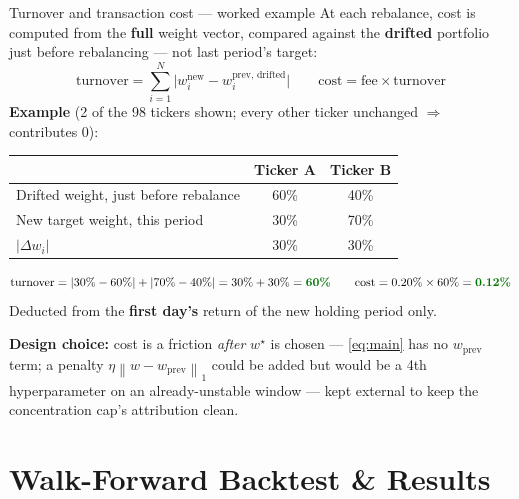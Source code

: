 \documentclass[aspectratio=169]{beamer}
\newcommand{\norm}[1]{\left\lVert #1 \right\rVert}
\newcommand{\good}[1]{\textcolor{green!45!black}{\textbf{#1}}}
\begin{document}
\begin{frame}{Turnover and transaction cost --- worked example}
  \small
  At each rebalance, cost is computed from the \textbf{full} weight vector, compared against
  the \textbf{drifted} portfolio just before rebalancing --- not last period's target:
  \[
    \text{turnover} = \sum_{i=1}^{N} \bigl|w^{\text{new}}_i - w^{\text{prev, drifted}}_i\bigr|
    \qquad
    \text{cost} = \text{fee} \times \text{turnover}
  \]
  \vspace{0.15cm}
  \textbf{Example} (2 of the 98 tickers shown; every other ticker unchanged $\Rightarrow$
  contributes $0$):
  \begin{center}
  \begin{tabular}{@{}lcc@{}}
  \toprule
   & Ticker A & Ticker B \\
  \midrule
  Drifted weight, just before rebalance & 60\% & 40\% \\
  New target weight, this period        & 30\% & 70\% \\
  $|\Delta w_i|$                        & 30\% & 30\% \\
  \bottomrule
  \end{tabular}
  \end{center}
  \[
    \text{turnover} = |30\%-60\%| + |70\%-40\%| = 30\%+30\% = \good{60\%}
    \qquad
    \text{cost} = 0.20\% \times 60\% = \good{0.12\%}
  \]
  Deducted from the \textbf{first day's} return of the new holding period only.

  \textbf{Design choice:} cost is a friction \emph{after} $w^\star$ is chosen ---
  \cref{eq:main} has no $w_{\text{prev}}$ term; a penalty $\eta\norm{w-w_{\text{prev}}}_1$ could
  be added but would be a 4th hyperparameter on an already-unstable window --- kept external to
  keep the concentration cap's attribution clean.
\end{frame}

\section{Walk-Forward Backtest \& Results}
\end{document}
